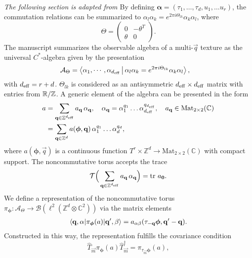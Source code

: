 \documentclass[
    aps,
    prb,
    twocolumn,
    floatfix,
    superscriptaddress,
	10pt
]{revtex4-2}
\begin{document}
{\it The following section is adapted from \cite{Liu2020}}   By defining $\boldsymbol{\alpha}=(\tau_1, \ldots, \tau_d, u_1,\ldots u_r )$, the commutation relations can be summarized to $\alpha_l \alpha_k = e^{2 \pi i \Theta_{lk}} \alpha_k  \alpha_l$, where
\begin{equation}
    \Theta = \begin{pmatrix}
    0 & -\theta^T \\
    \theta & 0
    \end{pmatrix} .
\end{equation}
The manuscript summarizes the observable algebra of a multi-$\vec{q}$ texture as the universal $C^\ast$-algebra given by the presentation
\begin{align}
    \mathcal{A}_\Theta &= \Braket{ \alpha_1, \cdots, \alpha_{{d_\mathrm{eff}}}
    |  \alpha_l \alpha_k = e^{ 2 \pi i \Theta_{lk}} \alpha_k  \alpha_l },
\end{align}
with ${d_\mathrm{eff}} = r+ d$.
$ \Theta_{lk}$ is considered as an antisymmetric  ${d_\mathrm{eff}}\times {d_\mathrm{eff}}$  matrix with entries from ${\mathbb R}/{\mathbb Z}$.
A generic element of the algebra can be presented in the form
\begin{align}
a & = \sum_{\mathbf{q} \in {\mathbb Z}^{{d_\mathrm{eff}}}} a_{\mathbf{q}}
\, \alpha_{\mathbf{q}}, \quad \alpha_{\mathbf{q}} =\alpha_1^{q_1} \ldots\alpha_{d_\mathrm{eff}}^{q_{d_\mathrm{eff}}}, \quad a_{\mathbf{q}} \in \mathrm{Mat}_{2\times2} (\mathbb{C})
\notag \\
& = 	\sum_{\mathbf{q} \in {\mathbb Z}^{d}} a( \boldsymbol{\phi}, \mathbf{q}) 
\, 
\alpha_1^{q_1} \ldots\alpha_d^{q_d},
\end{align}
where $ a(\boldsymbol{\phi},\vec{q}) $  is a continuous function $T^r \times \mathbb{Z}^d \to \mathrm{Mat}_{2\times 2}(\mathbb{C})$ with compact support.
The noncommutative torus accepts the trace
\begin{equation}
	\mathcal{T} \Big(
		\sum_{\mathbf{q} \in {\mathbb Z}^{{d_\mathrm{eff}}}} a_{\mathbf{q}}
\, \alpha_{\mathbf{q}}
	\Big)
	= \mathrm{tr}~ a_{\mathbf{0}} .
\end{equation}
We define a representation of the noncommutative torus $\pi_{\boldsymbol{\phi}} \colon \mathcal{A}_\Theta \to \mathcal{B}(\ell^2(\mathbb{Z}^d \otimes \mathbb{C}^2))$ via the matrix elements
\begin{align}
	\braket{\mathbf{q}, \alpha
	|
	\pi_{\boldsymbol{\phi}} (a)
	| \mathbf{q}', \beta
	}
	=
	a_{\alpha \beta} ( \tau_{-\mathbf{q}} \boldsymbol{\phi}, \mathbf{q}'-\mathbf{q}) .
\end{align}
Constructed in this way, the representation fulfills the covariance condition
\begin{equation}
	\hat{T}_{\vec{m}}
	\pi_{\boldsymbol{\phi}} (a)
	\hat{T}_{\vec{m}}^\dagger
	= \pi_{\tau_{\vec{m}}\boldsymbol{\phi}} (a) ,
\end{equation}
\end{document}
